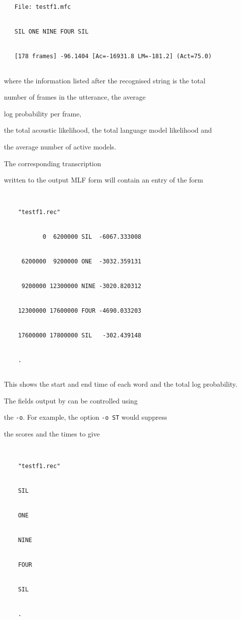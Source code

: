 \begin{verbatim}


   File: testf1.mfc


   SIL ONE NINE FOUR SIL 


   [178 frames] -96.1404 [Ac=-16931.8 LM=-181.2] (Act=75.0)


\end{verbatim}


where the information listed after the recognised string is the total


number of frames in the utterance, the average 


log probability per frame,


the total acoustic likelihood, the total language model likelihood and


the average number of active models.





The corresponding transcription


written to the output MLF form will contain an entry of the form







\begin{verbatim}


    "testf1.rec"


           0  6200000 SIL  -6067.333008


     6200000  9200000 ONE  -3032.359131


     9200000 12300000 NINE -3020.820312


    12300000 17600000 FOUR -4690.033203


    17600000 17800000 SIL   -302.439148


    .   


\end{verbatim}


This shows the start and end time of each word and the total log probability.


The fields output by  can be controlled using 


the \texttt{-o}.  For example, the option \texttt{-o ST} would suppress


the scores and the times to give


\begin{verbatim}


    "testf1.rec"


    SIL 


    ONE


    NINE


    FOUR


    SIL 


    .   


\end{verbatim}





